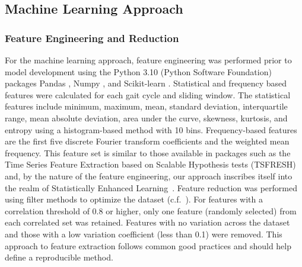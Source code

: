 \documentclass[sensors,article,submit,pdftex,moreauthors]{Definitions/mdpi}
\begin{document}
\subsection{Machine Learning Approach}
\subsubsection{Feature Engineering and Reduction}
For the machine learning approach, feature engineering was performed prior to model development using the Python 3.10 (Python Software Foundation) packages Pandas \cite{reback2020pandas}, Numpy \cite{harris2020array}, and Scikit-learn \cite{scikit-learn}. Statistical and frequency based features were calculated for each gait cycle and sliding window. The statistical features include minimum, maximum, mean, standard deviation, interquartile range, mean absolute deviation, area under the curve, skewness, kurtosis, and entropy using a histogram-based method with 10 bins. Frequency-based features are the first five discrete Fourier transform coefficients and the weighted mean frequency. This feature set is similar to those available in packages such as the Time Series Feature Extraction based on Scalable Hypothesis tests (TSFRESH)~\cite{tsfresh_2018} and, by the nature of the feature engineering, our approach inscribes itself into the realm of Statistically Enhanced Learning~\cite{felice2025boosting}. 
Feature reduction was performed using filter methods to optimize the dataset (c.f.~\cite{saeys_2007}). For features with a correlation threshold of 0.8 or higher, only one feature (randomly selected) from each correlated set was retained. Features with no variation across the dataset and those with a low variation coefficient (less than 0.1) were removed. This approach to feature extraction follows common good practices and should help define a reproducible method.
\end{document}
